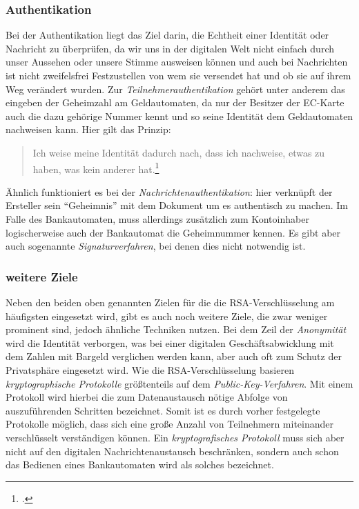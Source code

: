 \documentclass{scrarticle} %
\begin{document}
    \subsubsection{Authentikation}
    Bei der Authentikation liegt das Ziel darin, die Echtheit einer Identität oder Nachricht zu überprüfen, da wir uns in der digitalen Welt nicht einfach durch unser Aussehen oder unsere Stimme ausweisen können und auch bei Nachrichten ist nicht zweifelsfrei Festzustellen von wem sie versendet hat und ob sie auf ihrem Weg verändert wurden. Zur \emph{Teilnehmerauthentikation} gehört unter anderem das eingeben der Geheimzahl am Geldautomaten, da nur der Besitzer der EC-Karte auch die dazu gehörige Nummer kennt und so seine Identität dem Geldautomaten nachweisen kann. Hier gilt das Prinzip:
    \begin{quote}
        Ich weise meine Identität dadurch nach, dass ich nachweise, etwas zu haben, was kein anderer hat.\footcite{beutelspacher2015}
    \end{quote}
    Ähnlich funktioniert es bei der \emph{Nachrichtenauthentikation}: hier verknüpft der Ersteller sein \enquote{Geheimnis} mit dem Dokument um es authentisch zu machen. Im Falle des Bankautomaten, muss allerdings zusätzlich zum Kontoinhaber logischerweise auch der Bankautomat die Geheimnummer kennen. Es gibt aber auch sogenannte \emph{Signaturverfahren}, bei denen dies nicht notwendig ist.
    \subsubsection{weitere Ziele}
    Neben den beiden oben genannten Zielen für die die RSA-Verschlüsselung am häufigsten eingesetzt wird, gibt es auch noch weitere Ziele, die zwar weniger prominent sind, jedoch ähnliche Techniken nutzen. Bei dem Zeil der \emph{Anonymität} wird die Identität verborgen, was bei einer digitalen Geschäftsabwicklung mit dem Zahlen mit Bargeld verglichen werden kann, aber auch oft zum Schutz der Privatsphäre eingesetzt wird. Wie die RSA-Verschlüsselung basieren \emph{kryptographische Protokolle} größtenteils auf dem \emph{Public-Key-Verfahren}. Mit einem Protokoll wird hierbei die zum Datenaustausch nötige Abfolge von auszuführenden Schritten bezeichnet. Somit ist es durch vorher festgelegte Protokolle möglich, dass sich eine große Anzahl von Teilnehmern miteinander verschlüsselt verständigen können. Ein \emph{kryptografisches Protokoll} muss sich aber nicht auf den digitalen Nachrichtenaustausch beschränken, sondern auch schon das Bedienen eines Bankautomaten wird als solches bezeichnet.
\end{document}
